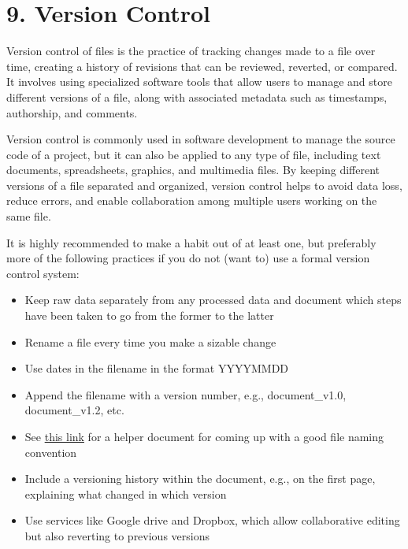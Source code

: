 \documentclass[
  letterpaper,
  DIV=11,
  numbers=noendperiod]{scrreprt}
\begin{document}

\hypertarget{version-control-1}{%
\chapter*{9. Version Control}\label{version-control-1}}


Version control of files is the practice of tracking changes made to a
file over time, creating a history of revisions that can be reviewed,
reverted, or compared. It involves using specialized software tools that
allow users to manage and store different versions of a file, along with
associated metadata such as timestamps, authorship, and comments.

Version control is commonly used in software development to manage the
source code of a project, but it can also be applied to any type of
file, including text documents, spreadsheets, graphics, and multimedia
files. By keeping different versions of a file separated and organized,
version control helps to avoid data loss, reduce errors, and enable
collaboration among multiple users working on the same file.

It is highly recommended to make a habit out of at least one, but
preferably more of the following practices if you do not (want to) use a
formal version control system:

\begin{itemize}
\item
  Keep raw data separately from any processed data and document which
  steps have been taken to go from the former to the latter
\item
  Rename a file every time you make a sizable change
\item
  Use dates in the filename in the format YYYYMMDD
\item
  Append the filename with a version number, e.g., document\_v1.0,
  document\_v1.2, etc.
\item
  See \href{https://authors.library.caltech.edu/103626/}{this link} for
  a helper document for coming up with a good file naming convention
\item
  Include a versioning history within the document, e.g., on the first
  page, explaining what changed in which version
\item
  Use services like Google drive and Dropbox, which allow collaborative
  editing but also reverting to previous versions
\end{itemize}
\end{document}

